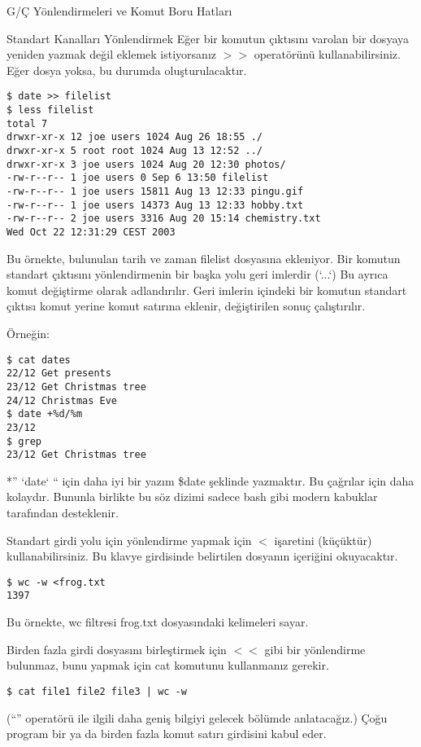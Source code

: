 \begin{section}{G/Ç Yönlendirmeleri ve Komut Boru Hatları}
\begin{subsection}{Standart Kanalları Yönlendirmek}
Eğer bir komutun çıktısını varolan bir dosyaya yeniden yazmak değil eklemek istiyorsanız $>>$ operatörünü kullanabilirsiniz. Eğer dosya yoksa, bu durumda oluşturulacaktır.
\begin{verbatim}
$ date >> filelist
$ less filelist
total 7
drwxr-xr-x 12 joe users 1024 Aug 26 18:55 ./
drwxr-xr-x 5 root root 1024 Aug 13 12:52 ../
drwxr-xr-x 3 joe users 1024 Aug 20 12:30 photos/
-rw-r--r-- 1 joe users 0 Sep 6 13:50 filelist
-rw-r--r-- 1 joe users 15811 Aug 13 12:33 pingu.gif
-rw-r--r-- 1 joe users 14373 Aug 13 12:33 hobby.txt
-rw-r--r-- 2 joe users 3316 Aug 20 15:14 chemistry.txt
Wed Oct 22 12:31:29 CEST 2003
\end{verbatim}

Bu örnekte, bulunulan tarih ve zaman filelist dosyasına ekleniyor. Bir komutun standart çıktısını yönlendirmenin bir başka yolu geri imlerdir (`...`) Bu ayrıca komut değiştirme olarak adlandırılır. Geri imlerin içindeki bir komutun standart çıktısı komut yerine komut satırına eklenir, değiştirilen sonuç çalıştırılır.

Örneğin:
\begin{verbatim}
$ cat dates 		
22/12 Get presents
23/12 Get Christmas tree
24/12 Christmas Eve
$ date +%d/%m 			
23/12
$ grep 			
23/12 Get Christmas tree
\end{verbatim}

*” `date` “ için daha iyi bir yazım \$date şeklinde yazmaktır. Bu çağrılar için daha kolaydır. Bununla birlikte bu söz dizimi sadece bash gibi modern kabuklar tarafından desteklenir.

Standart girdi yolu için yönlendirme yapmak için $<$ işaretini (küçüktür) kullanabilirsiniz. Bu klavye girdisinde belirtilen dosyanın içeriğini okuyacaktır. 
\begin{verbatim}
$ wc -w <frog.txt 
1397 
\end{verbatim}

Bu örnekte, wc filtresi frog.txt dosyasındaki kelimeleri sayar.

Birden fazla girdi dosyasını birleştirmek için $<<$ gibi bir yönlendirme bulunmaz, bunu yapmak için cat komutunu kullanmanız gerekir.

\begin{verbatim}
$ cat file1 file2 file3 | wc -w
\end{verbatim}

(“\textbar” operatörü ile ilgili daha geniş bilgiyi gelecek bölümde anlatacağız.) Çoğu program bir ya da birden fazla komut satırı girdisini kabul eder.


\end{subsection}
\end{section}

